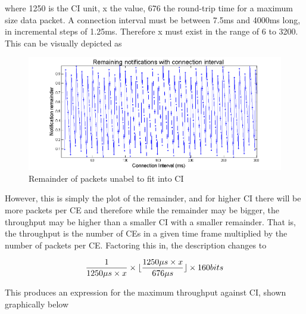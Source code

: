 \documentclass[]{article}
\DeclarePairedDelimiter\floor{\lfloor}{\rfloor}
\begin{document}
where 1250 is the \ac{CI} unit, x the value, 676 the round-trip time for a maximum size data packet. A connection interval must be between 7.5ms and 4000ms long, in incremental steps of 1.25ms. Therefore x must exist in the range of 6 to 3200. This can be visually depicted as

\begin{figure}[H]
	\begin{center}
		\includegraphics[width = \textwidth]{notremain}
	\end{center}
	\caption{Remainder of packets unabel to fit into \ac{CI}}
	\label{fig:notremain}
\end{figure}

However, this is simply the plot of the remainder, and for higher \ac{CI} there will be more packets per \ac{CE} and therefore while the remainder may be bigger, the throughput may be higher than a smaller \ac{CI} with a smaller remainder. That is, the throughput is the number of \ac{CE}s in a given time frame multiplied by the number of packets per \ac{CE}. Factoring this in, the description changes to

\begin{displaymath}
 \frac{1}{1250 \mu s \times x} \times \floor{ \frac{1250 \mu s\times x}{676 \mu s}} \times 160 bits 
\end{displaymath}

This produces an expression for the maximum throughput against \ac{CI}, shown graphically below
\end{document}
